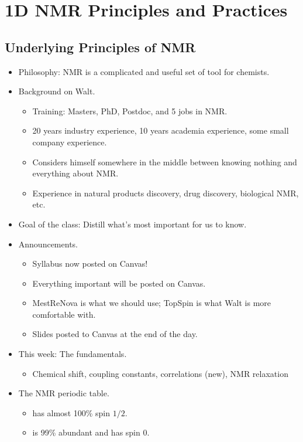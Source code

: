 \documentclass[../notes.tex]{subfiles}
\begin{document}
\chapter{1D NMR Principles and Practices}
\section{Underlying Principles of NMR}
\begin{itemize}
    \item {}Philosophy: NMR is a complicated and useful set of tool for chemists.
    \item Background on Walt.
    \begin{itemize}
        \item Training: Masters, PhD, Postdoc, and 5 jobs in NMR.
        \item 20 years industry experience, 10 years academia experience, some small company experience.
        \item Considers himself somewhere in the middle between knowing nothing and everything about NMR.
        \item Experience in natural products discovery, drug discovery, biological NMR, etc.
    \end{itemize}
    \item Goal of the class: Distill what's most important for us to know.
    \item Announcements.
    \begin{itemize}
        \item Syllabus now posted on Canvas!
        \item Everything important will be posted on Canvas.
        \item MestReNova is what we should use; TopSpin is what Walt is more comfortable with.
        \item Slides posted to Canvas at the end of the day.
    \end{itemize}
    \item This week: The fundamentals.
    \begin{itemize}
        \item Chemical shift, coupling constants, correlations (new), NMR relaxation
    \end{itemize}
    \item The NMR periodic table.
    \begin{itemize}
        \item {} has almost 100\% spin $1/2$.
        \item {} is 99\% abundant and has spin 0.

\end{itemize}
\end{itemize}
\end{document}
